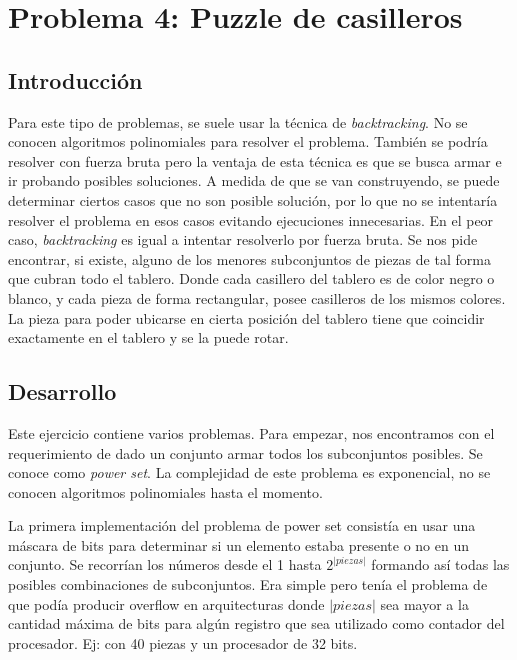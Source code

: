 \section{Problema 4: Puzzle de casilleros}

\subsection{Introducci\'on}

\quad Para este tipo de problemas, se suele usar la t\'ecnica de \textit{backtracking}. No se conocen algoritmos polinomiales para resolver el problema. Tambi\'en se podr\'ia resolver con fuerza bruta pero la ventaja de esta t\'ecnica es que se busca armar e ir probando posibles soluciones. A medida de que se van construyendo, se puede determinar ciertos casos que no son posible soluci\'on, por lo que no se intentar\'ia resolver el problema en esos casos evitando ejecuciones innecesarias. En el peor caso, \textit{backtracking} es igual a intentar resolverlo por fuerza bruta.
\quad Se nos pide encontrar, si existe, alguno de los menores subconjuntos de piezas de tal forma que cubran todo el tablero. Donde cada casillero del tablero es de color negro o blanco, y cada pieza de forma rectangular, posee casilleros de los mismos colores. La pieza para poder ubicarse en cierta posici\'on del tablero tiene que coincidir exactamente en el tablero y se la puede rotar. 

\subsection{Desarrollo}

\quad Este ejercicio contiene varios problemas. Para empezar, nos encontramos con el requerimiento de dado un conjunto armar todos los subconjuntos posibles. Se conoce como \textit{power set}. La complejidad de este problema es exponencial, no se conocen algoritmos polinomiales hasta el momento.

\quad La primera implementaci\'on del problema de power set consist\'ia en usar una m\'ascara de bits para determinar si un elemento estaba presente o no en un conjunto. Se recorr\'ian los n\'umeros desde el 1 hasta $ 2^{ \vert piezas\vert} $ formando as\'i todas las posibles combinaciones de subconjuntos. Era simple pero ten\'ia el problema de que pod\'ia producir overflow en arquitecturas donde ${\vert piezas\vert} $ sea mayor a la cantidad m\'axima de bits para alg\'un registro que sea utilizado como contador del procesador. Ej: con 40 piezas y un procesador de 32 bits.

